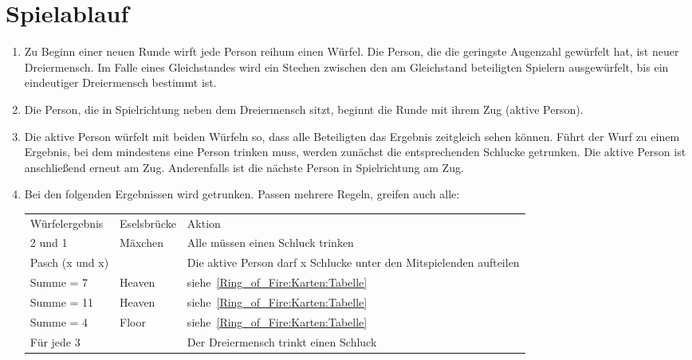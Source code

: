 \section{Spielablauf}
\begin{enumerate}[label={(\arabic*)}]
	\item\label{Dreiermensch:Spielablauf:NeueRunde}
	Zu Beginn einer neuen Runde wirft jede Person reihum einen Würfel.
	Die Person, die die geringste Augenzahl gewürfelt hat, ist neuer Dreiermensch.
	Im Falle eines Gleichstandes wird ein Stechen zwischen den am Gleichstand beteiligten Spielern ausgewürfelt, bis ein eindeutiger Dreiermensch bestimmt ist.
	
	\item
	Die Person, die in Spielrichtung neben dem Dreiermensch sitzt, beginnt die Runde mit ihrem Zug (\glqq{}aktive Person\grqq{}).
	
	\item
	Die aktive Person würfelt mit beiden Würfeln so, dass alle Beteiligten das Ergebnis zeitgleich sehen können.
	Führt der Wurf zu einem Ergebnis, bei dem mindestens eine Person trinken muss, werden zunächst die entsprechenden Schlucke getrunken.
	Die aktive Person ist anschließend erneut am Zug.
	Anderenfalls ist die nächste Person in Spielrichtung am Zug.
	
	\item
	Bei den folgenden Ergebnissen wird getrunken. 
	Passen mehrere Regeln, greifen auch alle:
	
	\begin{tabulary}{0.92\textwidth}{llL}
		\toprule
		Würfelergebnis   & Eselsbrücke & Aktion \\
		2 und 1          & Mäxchen & Alle müssen einen Schluck trinken \\
		Pasch (x und x)  &         & Die aktive Person darf x Schlucke unter den Mitspielenden aufteilen \\
		Summe = 7        & Heaven  & siehe~\ref{Ring_of_Fire:Karten:Tabelle} \\
		Summe = 11       & Heaven  & siehe~\ref{Ring_of_Fire:Karten:Tabelle} \\
		Summe = 4        & Floor   & siehe~\ref{Ring_of_Fire:Karten:Tabelle} \\
		Für jede 3 &         &Der Dreiermensch trinkt einen Schluck \\\bottomrule
	\end{tabulary}\\


\end{enumerate}

